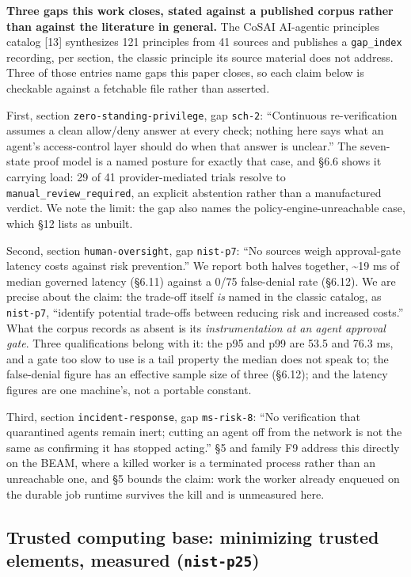 \documentclass[11pt]{article}
\begin{document}
\textbf{Three gaps this work closes, stated against a published corpus rather than against the literature in general.} The CoSAI AI-agentic principles catalog {[}13{]} synthesizes 121 principles from 41 sources and publishes a \texttt{gap\_index} recording, per section, the classic principle its source material does not address. Three of those entries name gaps this paper closes, so each claim below is checkable against a fetchable file rather than asserted.

First, section \texttt{zero-standing-privilege}, gap \texttt{sch-2}: ``Continuous re-verification assumes a clean allow/deny answer at every check; nothing here says what an agent's access-control layer should do when that answer is unclear.'' The seven-state proof model is a named posture for exactly that case, and \S6.6 shows it carrying load: 29 of 41 provider-mediated trials resolve to \texttt{manual\_review\_required}, an explicit abstention rather than a manufactured verdict. We note the limit: the gap also names the policy-engine-unreachable case, which \S12 lists as unbuilt.

Second, section \texttt{human-oversight}, gap \texttt{nist-p7}: ``No sources weigh approval-gate latency costs against risk prevention.'' We report both halves together, \textasciitilde19 ms of median governed latency (\S6.11) against a 0/75 false-denial rate (\S6.12). We are precise about the claim: the trade-off itself \emph{is} named in the classic catalog, as \texttt{nist-p7}, ``identify potential trade-offs between reducing risk and increased costs.'' What the corpus records as absent is its \emph{instrumentation at an agent approval gate}. Three qualifications belong with it: the p95 and p99 are 53.5 and 76.3 ms, and a gate too slow to use is a tail property the median does not speak to; the false-denial figure has an effective sample size of three (\S6.12); and the latency figures are one machine's, not a portable constant.

Third, section \texttt{incident-response}, gap \texttt{ms-risk-8}: ``No verification that quarantined agents remain inert; cutting an agent off from the network is not the same as confirming it has stopped acting.'' \S5 and family F9 address this directly on the BEAM, where a killed worker is a terminated process rather than an unreachable one, and \S5 bounds the claim: work the worker already enqueued on the durable job runtime survives the kill and is unmeasured here.

\subsection{Trusted computing base: minimizing trusted elements, measured (\texttt{nist-p25})}\label{trusted-computing-base}
\end{document}

